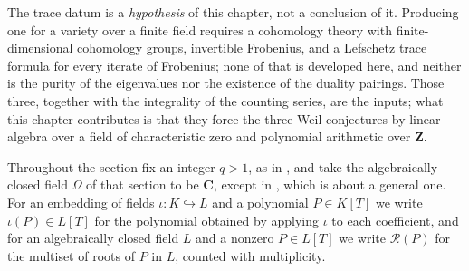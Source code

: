 The trace datum is a \emph{hypothesis} of this chapter, not a conclusion of
it.  Producing one for a variety over a finite field requires a cohomology
theory with finite-dimensional cohomology groups, invertible Frobenius, and a
Lefschetz trace formula for every iterate of Frobenius; none of that is
developed here, and neither is the purity of the eigenvalues nor the
existence of the duality pairings.  Those three, together with the
integrality of the counting series, are the inputs; what this chapter
contributes is that they force the three Weil conjectures by linear algebra
over a field of characteristic zero and polynomial arithmetic over
$\mathbf Z$.

Throughout the section fix an integer $q>1$, as in ,
and take the algebraically closed field $\Omega$ of that section to be
$\mathbf C$, except in , which is
about a general one.  For an embedding of fields $\iota:K\hookrightarrow L$
and a polynomial $P\in K[T]$ we write $\iota(P)\in L[T]$ for the polynomial
obtained by applying $\iota$ to each coefficient, and for an algebraically
closed field $L$ and a nonzero $P\in L[T]$ we write $\mathcal R(P)$ for the
multiset of roots of $P$ in $L$, counted with multiplicity.

